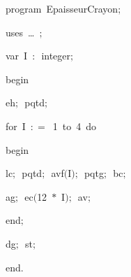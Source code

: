 
{
\parindent {}
\medskip

\carrenoir
\vspace{\neglskip}\mbox{\blc  \idt  \mcl program\idt \ EpaisseurCrayon$;$
}\par 
\vspace{\neglskip}\mbox{\blc \blk\idt \mcl uses\idt \ \ldots\ $;$
}\par 
\pagebreak[3] 
\vspace{\neglskip}\mbox{\blc  \blk\idt  \mcl var\idt \ I\ $:$\ integer$;$}\par 
\vspace{\neglskip}\mbox{\blc  \idt  \mcl begin\idt }\par 
\vspace{\neglskip}\mbox{\blc  \blk\idt  eh$;$\ pqtd$;$\ }\par 
\pagebreak[3] 
\vspace{\neglskip}\mbox{\blc  \blk\idt  \mcl for\idt \ I\ $:$$=$\ 1\ \mcl to\idt \ 4\ \mcl do\idt }\par 
\vspace{\neglskip}\mbox{\blc  \blk\blk\idt  \mcl begin\idt }\par 
\vspace{\neglskip}\mbox{\blc  \blk\blk\blk\idt  lc$;$\ pqtd$;$\ avf$($I$)$$;$\ pqtg$;$\ bc$;$\ }\par 
\vspace{\neglskip}\mbox{\blc  \blk\blk\blk\idt  ag$;$\ ec$($12\ $\ast$\ I$)$$;$\ av$;$}\par 
\vspace{\neglskip}\mbox{\blc  \blk\blk\idt  \mcl end\idt $;$}\par 
\vspace{\neglskip}\mbox{\blc  \blk\idt  dg$;$\ st$;$}\par 
\vspace{\neglskip}\mbox{\blc  \idt  \mcl end\idt $.$}\par 

\medskip }

